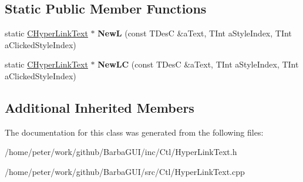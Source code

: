 \subsection*{Static Public Member Functions}
\begin{DoxyCompactItemize}
\item 
\mbox{\label{classCHyperLinkText_a1a4039890d11d88831bf7bb86efbe2b0}} 
static \hyperlink{classCHyperLinkText}{C\+Hyper\+Link\+Text} $\ast$ {\bfseries NewL} (const T\+DesC \&a\+Text, T\+Int a\+Style\+Index, T\+Int a\+Clicked\+Style\+Index)
\item 
\mbox{\label{classCHyperLinkText_aad53389ae36964268e601a33c1576c38}} 
static \hyperlink{classCHyperLinkText}{C\+Hyper\+Link\+Text} $\ast$ {\bfseries New\+LC} (const T\+DesC \&a\+Text, T\+Int a\+Style\+Index, T\+Int a\+Clicked\+Style\+Index)
\end{DoxyCompactItemize}
\subsection*{Additional Inherited Members}


The documentation for this class was generated from the following files\+:\begin{DoxyCompactItemize}
\item 
/home/peter/work/github/\+Barba\+G\+U\+I/inc/\+Ctl/Hyper\+Link\+Text.\+h\item 
/home/peter/work/github/\+Barba\+G\+U\+I/src/\+Ctl/Hyper\+Link\+Text.\+cpp\end{DoxyCompactItemize}
